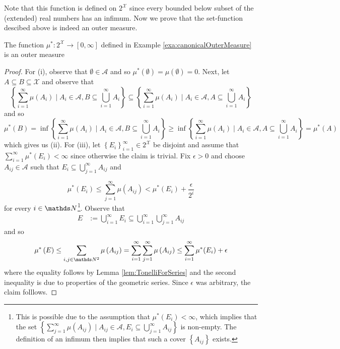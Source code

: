 Note that this function is defined on $2^{\mathcal{X}}$ since every
bounded below subset of the (extended) real numbers has an infimum.
Now we prove that the set-function descibed above is indeed an outer
measure.
\begin{prop}
\label{prop:canonicalOuterMeasureIsOuterMeasure}The function $\mu^{*}:2^{\mathcal{X}}\longrightarrow\left[0,\infty\right]$
defined in Example \ref{exa:canonicalOuterMeasure} is an outer measure
\end{prop}

\begin{proof}
For (i), observe that $\emptyset\in\mathcal{A}$ and so $\mu^{*}\left(\emptyset\right)=\mu\left(\emptyset\right)=0.$
Next, let $A\subseteq B\subseteq\mathcal{X}$ and observe that 
\[
\left\{ \sum_{i=1}^{\infty}\mu\left(A_{i}\right)\mid A_{i}\in\mathcal{A},B\subseteq\bigcup_{i=1}^{\infty}A_{i}\right\} \subseteq\left\{ \sum_{i=1}^{\infty}\mu\left(A_{i}\right)\mid A_{i}\in\mathcal{A},A\subseteq\bigcup_{i=1}^{\infty}A_{i}\right\} 
\]
and so 
\[
\mu^{*}\left(B\right)=\inf\left\{ \sum_{i=1}^{\infty}\mu\left(A_{i}\right)\mid A_{i}\in\mathcal{A},B\subseteq\bigcup_{i=1}^{\infty}A_{i}\right\} \geq\inf\left\{ \sum_{i=1}^{\infty}\mu\left(A_{i}\right)\mid A_{i}\in\mathcal{A},A\subseteq\bigcup_{i=1}^{\infty}A_{i}\right\} =\mu^{*}\left(A\right)
\]
which gives us (ii). For (iii), let $\left\{ E_{i}\right\} _{i=1}^{\infty}\in2^{\mathcal{X}}$
be disjoint and assume that $\sum_{i=1}^{\infty}\mu^{*}\left(E_{i}\right)<\infty$
since otherwise the claim is trivial. Fix $\epsilon>0$ and choose
$A_{ij}\in\mathcal{A}$ such that $E_{i}\subseteq\bigcup_{j=1}^{\infty}A_{ij}$
and

\[
\mu^{*}\left(E_{i}\right)\leq\sum_{j=1}^{\infty}\mu(A_{ij})<\mu^{*}\left(E_{i}\right)+\frac{\epsilon}{2^{i}}
\]
for every $i\in\N$\footnote{This is possible due to the assumption that $\mu^{*}\left(E_{i}\right)<\infty$,
which implies that the set $\left\{ \sum_{j=1}^{\infty}\mu\left(A_{ij}\right)\mid A_{ij}\in\mathcal{A},E_{i}\subseteq\bigcup_{j=1}^{\infty}A_{ij}\right\} $
is non-empty. The definition of an infimum then implies that such
a cover $\left\{ A_{ij}\right\} $ exists.}. Observe that
\begin{align*}
E & :=\bigcup_{i=1}^{\infty}E_{i}\subseteq\bigcup_{i=1}^{\infty}\bigcup_{j=1}^{\infty}A_{ij}
\end{align*}
and so 
\[
\mu^{*}\left(E\right)\leq\sum_{i,j\in\N^{2}}\mu\left(A_{ij}\right)=\sum_{i=1}^{\infty}\sum_{j=1}^{\infty}\mu\left(A_{ij}\right)\leq\sum_{i=1}^{\infty}\mu^{*}(E_{i})+\epsilon
\]
where the equality follows by Lemma \ref{lem:TonelliForSeries} and
the second inequality is due to properties of the geometric series.
Since $\epsilon$ was arbitrary, the claim folllows.
\end{proof}
